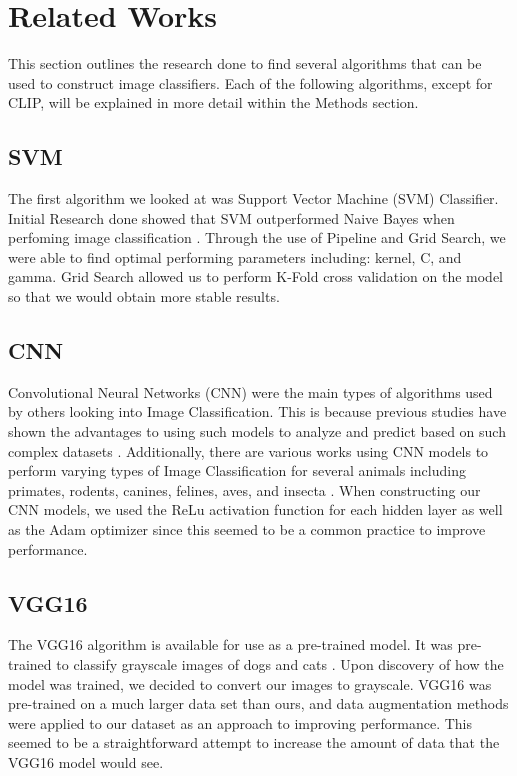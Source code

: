 \graphicspath{ {project_images/} }
\section{Related Works}

This section outlines the research done to find several algorithms that can be used to construct image classifiers.
Each of the following algorithms, except for CLIP, will be explained in more detail within the Methods section.

\subsection{SVM}
The first algorithm we looked at was Support Vector Machine (SVM) Classifier. 
Initial Research done showed that SVM outperformed Naive Bayes when perfoming image classification \cite{SVM}.
Through the use of Pipeline and Grid Search, we were able to find optimal performing parameters including: kernel, C, and gamma.
Grid Search allowed us to perform K-Fold cross validation on the model so that we would obtain more stable results.

\subsection{CNN}
Convolutional Neural Networks (CNN) were the main types of algorithms used by others looking into Image Classification.
This is because previous studies have shown the advantages to using such models to analyze and predict based on such complex datasets \cite{CNNPerformance}.
Additionally, there are various works using CNN models to perform varying types of Image Classification for several animals including primates, rodents, canines, felines, aves, and insecta \cite{AnimalSpecies1, AnimalSpecies2, AnimalBreed, Mosquito}.
When constructing our CNN models, we used the ReLu activation function for each hidden layer as well as the Adam optimizer since this seemed to be a common practice to improve performance.

\subsection{VGG16}
The VGG16 algorithm is available for use as a pre-trained model.
It was pre-trained to classify grayscale images of dogs and cats \cite{VGG16Greyscale}.
Upon discovery of how the model was trained, we decided to convert our images to grayscale.
VGG16 was pre-trained on a much larger data set than ours, and data augmentation methods were applied to our dataset as an approach to improving performance.
This seemed to be a straightforward attempt to increase the amount of data that the VGG16 model would see.

